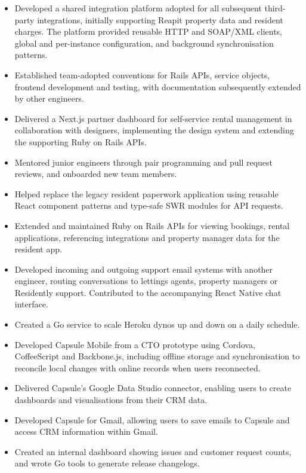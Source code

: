 \begin{itemize}
    \item Developed a shared integration platform adopted for all subsequent third-party integrations, initially supporting Reapit property data and resident charges. The platform provided reusable HTTP and SOAP/XML clients, global and per-instance configuration, and background synchronisation patterns.
    \item Established team-adopted conventions for Rails APIs, service objects, frontend development and testing, with documentation subsequently extended by other engineers.
    \item Delivered a Next.js partner dashboard for self-service rental management in collaboration with designers, implementing the design system and extending the supporting Ruby on Rails APIs.
    \item Mentored junior engineers through pair programming and pull request reviews, and onboarded new team members.
    \item Helped replace the legacy resident paperwork application using reusable React component patterns and type-safe SWR modules for API requests.
    \item Extended and maintained Ruby on Rails APIs for viewing bookings, rental applications, referencing integrations and property manager data for the resident app.
    \item Developed incoming and outgoing support email systems with another engineer, routing conversations to lettings agents, property managers or Residently support. Contributed to the accompanying React Native chat interface.
    \item Created a Go service to scale Heroku dynos up and down on a daily schedule.
\end{itemize}

\newpage

\begin{itemize}
    \item Developed Capsule Mobile from a CTO prototype using Cordova, CoffeeScript and Backbone.js, including offline storage and synchronisation to reconcile local changes with online records when users reconnected.
    \item Delivered Capsule's Google Data Studio connector, enabling users to create dashboards and visualisations from their CRM data.
    \item Developed Capsule for Gmail, allowing users to save emails to Capsule and access CRM information within Gmail.
    \item Created an internal dashboard showing issues and customer request counts, and wrote Go tools to generate release changelogs.
\end{itemize}

